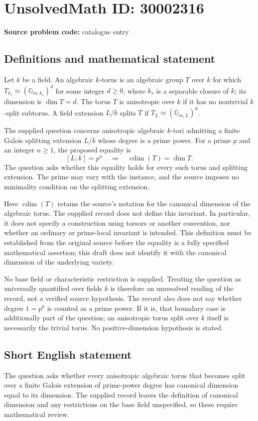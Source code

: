 \documentclass[11pt]{article}
\begin{document}
\section*{UnsolvedMath ID: 30002316}
\textbf{Source problem code:} catalogue entry
\subsection{Definitions and mathematical statement}
Let \(k\) be a field. An algebraic \(k\)-torus is an algebraic group \(T\) over \(k\) for which \(T_{k_s}\simeq (\mathbb{G}_{m,k_s})^d\) for some integer \(d\geq 0\), where \(k_s\) is a separable closure of \(k\); its dimension is \(\dim T=d\). The torus \(T\) is anisotropic over \(k\) if it has no nontrivial \(k\)-split subtorus. A field extension \(L/k\) splits \(T\) if \(T_L\simeq (\mathbb{G}_{m,L})^d\).

The supplied question concerns anisotropic algebraic \(k\)-tori admitting a finite Galois splitting extension \(L/k\) whose degree is a prime power. For a prime \(p\) and an integer \(n\geq 1\), the proposed equality is
\[
[L:k]=p^n \quad\Longrightarrow\quad \operatorname{cdim}(T)=\dim T.
\]
The question asks whether this equality holds for every such torus and splitting extension. The prime may vary with the instance, and the source imposes no minimality condition on the splitting extension.

Here \(\operatorname{cdim}(T)\) retains the source's notation for the canonical dimension of the algebraic torus. The supplied record does not define this invariant. In particular, it does not specify a construction using torsors or another convention, nor whether an ordinary or prime-local invariant is intended. This definition must be established from the original source before the equality is a fully specified mathematical assertion; this draft does not identify it with the canonical dimension of the underlying variety.

No base field or characteristic restriction is supplied. Treating the question as universally quantified over fields \(k\) is therefore an unresolved reading of the record, not a verified source hypothesis. The record also does not say whether degree \(1=p^0\) is counted as a prime power. If it is, that boundary case is additionally part of the question; an anisotropic torus split over \(k\) itself is necessarily the trivial torus. No positive-dimension hypothesis is stated.
\subsection{Short English statement}
The question asks whether every anisotropic algebraic torus that becomes split over a finite Galois extension of prime-power degree has canonical dimension equal to its dimension. The supplied record leaves the definition of canonical dimension and any restrictions on the base field unspecified, so these require mathematical review.
\end{document}
